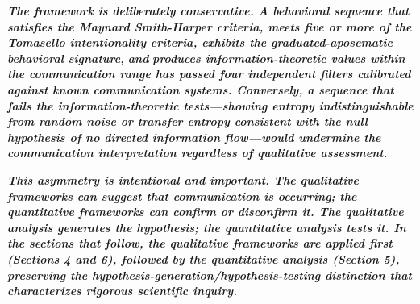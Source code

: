 \documentclass[11pt,letterpaper]{article}
\begin{document}
\begin{table}[H]
\centering
\small
{}
\caption*{\small\textit{Table 1. Multi-level communication detection framework.}}
\end{table}


\textbf{\textit{The framework is deliberately conservative. A behavioral sequence that satisfies the Maynard Smith-Harper criteria, meets five or more of the Tomasello intentionality criteria, exhibits the graduated-aposematic behavioral signature, }}\textbf{\textit{and}}\textbf{\textit{ produces information-theoretic values within the communication range has passed four independent filters calibrated against known communication systems. Conversely, a sequence that fails the information-theoretic tests---showing entropy indistinguishable from random noise or transfer entropy consistent with the null hypothesis of no directed information flow---would undermine the communication interpretation regardless of qualitative assessment.}}


\textbf{\textit{This asymmetry is intentional and important. The qualitative frameworks can suggest that communication is occurring; the quantitative frameworks can confirm or disconfirm it. The qualitative analysis generates the hypothesis; the quantitative analysis tests it. In the sections that follow, the qualitative frameworks are applied first (Sections 4 and 6), followed by the quantitative analysis (Section 5), preserving the hypothesis-generation/hypothesis-testing distinction that characterizes rigorous scientific inquiry.}}
\end{document}
